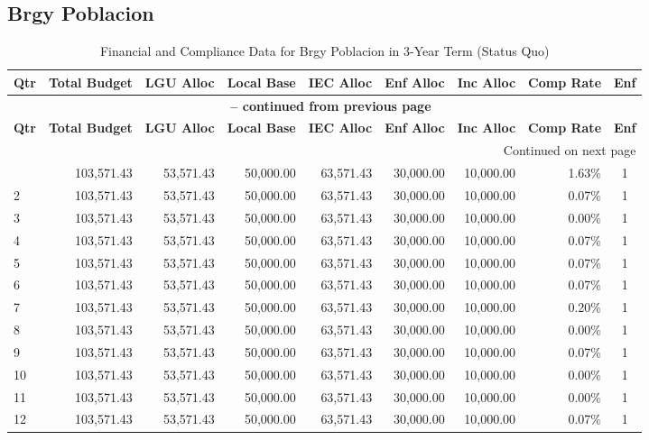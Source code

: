 \subsection{Brgy Poblacion}
\begin{longtable}{lrrrrrrrc}
\caption{Financial and Compliance Data for Brgy Poblacion in 3-Year Term (Status Quo)} \\
\toprule
\textbf{Qtr} & \textbf{Total Budget} & \textbf{LGU Alloc} & \textbf{Local Base} & \textbf{IEC Alloc} & \textbf{Enf Alloc} & \textbf{Inc Alloc} & \textbf{Comp Rate} & \textbf{Enf} \\
\midrule
\endfirsthead
\multicolumn{9}{c}{{\bfseries \tablename\ \thetable{} -- continued from previous page}} \\
\toprule
\textbf{Qtr} & \textbf{Total Budget} & \textbf{LGU Alloc} & \textbf{Local Base} & \textbf{IEC Alloc} & \textbf{Enf Alloc} & \textbf{Inc Alloc} & \textbf{Comp Rate} & \textbf{Enf} \\
\midrule
\endhead
\hline \multicolumn{9}{r}{{Continued on next page}} \\ \hline
\endfoot
\bottomrule
\endlastfoot
1 & 103,571.43 & 53,571.43 & 50,000.00 & 63,571.43 & 30,000.00 & 10,000.00 & 1.63\% & 1 \\
2 & 103,571.43 & 53,571.43 & 50,000.00 & 63,571.43 & 30,000.00 & 10,000.00 & 0.07\% & 1 \\
3 & 103,571.43 & 53,571.43 & 50,000.00 & 63,571.43 & 30,000.00 & 10,000.00 & 0.00\% & 1 \\
4 & 103,571.43 & 53,571.43 & 50,000.00 & 63,571.43 & 30,000.00 & 10,000.00 & 0.07\% & 1 \\
5 & 103,571.43 & 53,571.43 & 50,000.00 & 63,571.43 & 30,000.00 & 10,000.00 & 0.07\% & 1 \\
6 & 103,571.43 & 53,571.43 & 50,000.00 & 63,571.43 & 30,000.00 & 10,000.00 & 0.07\% & 1 \\
7 & 103,571.43 & 53,571.43 & 50,000.00 & 63,571.43 & 30,000.00 & 10,000.00 & 0.20\% & 1 \\
8 & 103,571.43 & 53,571.43 & 50,000.00 & 63,571.43 & 30,000.00 & 10,000.00 & 0.00\% & 1 \\
9 & 103,571.43 & 53,571.43 & 50,000.00 & 63,571.43 & 30,000.00 & 10,000.00 & 0.07\% & 1 \\
10 & 103,571.43 & 53,571.43 & 50,000.00 & 63,571.43 & 30,000.00 & 10,000.00 & 0.00\% & 1 \\
11 & 103,571.43 & 53,571.43 & 50,000.00 & 63,571.43 & 30,000.00 & 10,000.00 & 0.00\% & 1 \\
12 & 103,571.43 & 53,571.43 & 50,000.00 & 63,571.43 & 30,000.00 & 10,000.00 & 0.07\% & 1 \\
\end{longtable}
